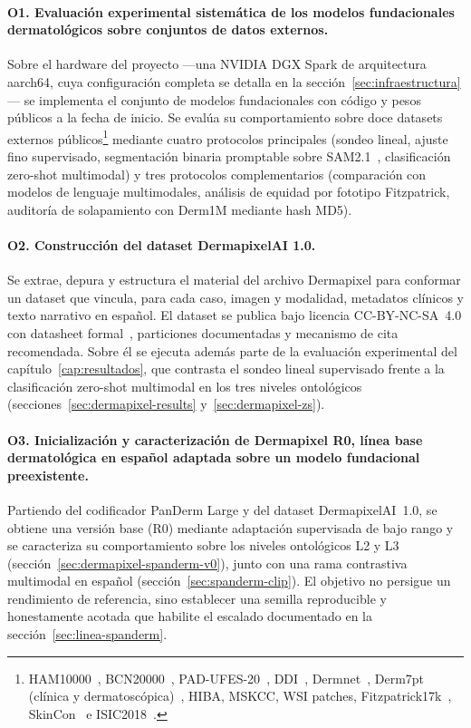 \paragraph{O1. Evaluación experimental sistemática de los modelos
fundacionales dermatológicos sobre conjuntos de datos externos.}
Sobre el hardware del proyecto ---una NVIDIA DGX Spark de
arquitectura aarch64, cuya configuración completa se detalla en la
sección~\ref{sec:infraestructura}--- se implementa el conjunto de
modelos fundacionales con código y pesos públicos a la fecha de
inicio. Se evalúa su
comportamiento sobre doce datasets externos
públicos\footnote{HAM10000~\cite{ham10000},
BCN20000~\cite{bcn20000}, PAD-UFES-20~\cite{padufes},
DDI~\cite{ddi}, Dermnet~\cite{dermnet}, Derm7pt
(clínica y dermatoscópica)~\cite{kawahara2019}, HIBA, MSKCC, WSI
patches, Fitzpatrick17k~\cite{fitzpatrick17k},
SkinCon~\cite{skincon} e ISIC2018~\cite{isic2018}.} mediante cuatro
protocolos principales (sondeo lineal, ajuste fino supervisado,
segmentación binaria promptable sobre SAM2.1~\cite{sam2},
clasificación zero-shot multimodal) y tres protocolos
complementarios (comparación con modelos de lenguaje multimodales,
análisis de equidad por fototipo Fitzpatrick, auditoría de
solapamiento con Derm1M mediante hash MD5).

\paragraph{O2. Construcción del dataset DermapixelAI 1.0.}
Se extrae, depura y estructura el material del archivo Dermapixel
para conformar un dataset que vincula, para cada caso, imagen y
modalidad, metadatos clínicos y texto narrativo en español. El
dataset se publica bajo licencia CC-BY-NC-SA~4.0 con datasheet
formal~\cite{datasheets2018}, particiones documentadas y mecanismo
de cita recomendada. Sobre él se ejecuta además parte de la
evaluación experimental del capítulo~\ref{cap:resultados}, que
contrasta el sondeo lineal supervisado frente a la clasificación
zero-shot multimodal en los tres niveles ontológicos
(secciones~\ref{sec:dermapixel-results} y~\ref{sec:dermapixel-zs}).

\paragraph{O3. Inicialización y caracterización de Dermapixel R0,
línea base dermatológica en español adaptada sobre un modelo
fundacional preexistente.}
Partiendo del codificador PanDerm Large y del dataset
DermapixelAI~1.0, se obtiene una versión base (R0) mediante
adaptación supervisada de bajo rango y se caracteriza su
comportamiento sobre los niveles ontológicos L2 y L3
(sección~\ref{sec:dermapixel-spanderm-v0}), junto con una rama
contrastiva multimodal en español (sección~\ref{sec:spanderm-clip}).
El objetivo no persigue un rendimiento de referencia, sino establecer
una semilla reproducible y honestamente acotada que habilite el
escalado documentado en la sección~\ref{sec:linea-spanderm}.

